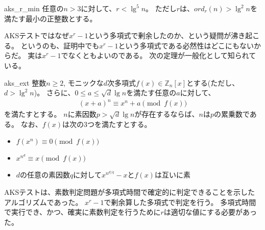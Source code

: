 \begin{Theo}{}{aks_r_min}
任意の$n>3$に対して、$r<\lg^5{n}$。
ただし$r$は、$ord_r(n) > \lg^2{n}$を満たす最小の正整数とする。
\end{Theo}

AKSテストではなぜ$x^r-1$という多項式で剰余したのか、という疑問が沸き起こる。
というのも、証明中でも$x^r-1$という多項式である必然性はどこにもないからだ。
実は$x^r-1$でなくともよいのである。
次の定理が一般化として知られている。

\begin{Theo}{}{aks_ext}
整数$n\ge2$, モニックな$d$次多項式$f(x)\in\mathbb{Z}_n[x]$とする(ただし、$d>\lg^2{n}$)。
さらに、$0\le a \le\sqrt{d}\lg{n}$を満たす任意の$a$に対して、
\begin{align*}
(x+a)^n\equiv x^n+a\pmod{f(x)}
\end{align*}
を満たすとする。
$n$に素因数$p>\sqrt{d}\lg{n}$が存在するならば、$n$は$p$の累乗数である。
なお、$f(x)$は次の3つを満たすとする。
\begin{itemize}
\item $f(x^n) \equiv 0 \pmod{f(x)}$
\item $x^{n^d}\equiv x\pmod{f(x)}$
\item $d$の任意の素因数$q$に対して$x^{n^{d/q}}-x$と$f(x)$は互いに素
\end{itemize}
\end{Theo}

AKSテストは、素数判定問題が多項式時間で確定的に判定できることを示したアルゴリズムであった。
$x^r-1$で剰余算した多項式で判定を行う。
多項式時間で実行でき、かつ、確実に素数判定を行うために$r$は適切な値にする必要があった。
